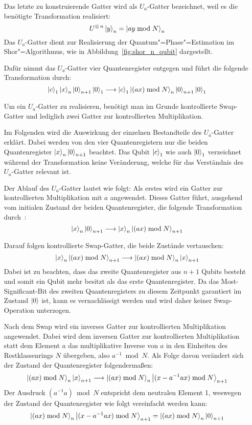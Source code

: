Das letzte zu konstruierende Gatter wird als \(U_a\)-Gatter bezeichnet, 
weil es die benötigte Transformation realisiert: 
\[U^{\operatorname{\otimes} n}\ket{y}_n = \ket{ay \bmod N}_n\] 
Das \(U_a\)-Gatter dient zur Realisierung der Quantum"=Phase"=Estimation im Shor"=Algorithmus, 
wie in Abbildung~\ref{fig:shor_n_qubit} dargestellt.

Dafür nimmt das \(U_a\)-Gatter vier Quantenregister entgegen und 
führt die folgende Transformation durch: 
\[\ket{c}_1\ket{x}_{n}\ket{0}_{n+1}\ket{0}_1
\longrightarrow
\ket{c}_1\ket{(a x) \bmod N}_{n}\ket{0}_{n+1}\ket{0}_1
\]

Um ein \(U_a\)-Gatter zu realisieren, benötigt man im Grunde kontrollierte Swap-Gatter und 
lediglich zwei Gatter zur kontrollierten Multiplikation. 
 
Im Folgenden wird die Auswirkung der einzelnen Bestandteile des \(U_a\)-Gatter erklärt.
Dabei werden von den vier Quantenregistern nur die beiden 
Quantenregister \(\ket{x}_{n}\ket{0}_{n+1}\) beachtet.
Das Qubit \(\ket{c}_1\) wie auch \(\ket{0}_1\) verzeichnet während der Transformation keine Veränderung, 
welche für das Verständnis des \(U_a\)-Gatter relevant ist.

Der Ablauf des \(U_a\)-Gatter lautet wie folgt:
Als erstes wird ein Gatter zur kontrollierten Multiplikation mit \(a\) angewendet. 
Dieses Gatter führt, 
ausgehend vom initialen Zustand der beiden Quantenregister, 
die folgende Transformation durch~\cite{beauregard2003circuit}:
\[
  \ket{x}_{n}\ket{0}_{n+1}
  \longrightarrow
  \ket{x}_{n}\ket{(ax)\bmod N}_{n+1}
  \]

Darauf folgen kontrollierte Swap-Gatter, die beide Zustände vertauschen:
\[
  \ket{x}_{n}\ket{(ax)\bmod N}_{n+1}
\longrightarrow
\ket{(ax)\bmod N}_{n}\ket{x}_{n+1}
\]
Dabei ist zu beachten, 
dass das zweite Quantenregister aus \(n+1\) Qubits besteht und
somit ein Qubit mehr besitzt als das erste Quantenregister.
Da das Most-Significant-Bit des zweiten Quantenregisters zu diesem Zeitpunkt garantiert im Zustand \(\ket{0}\) ist, 
kann es vernachlässigt werden und wird daher keiner Swap-Operation unterzogen.

Nach dem Swap wird ein inverses Gatter zur kontrollierten Multiplikation angewendet.
Dabei wird dem inversen Gatter zur kontrollierten Multiplikation statt dem Element \(a\) 
das multiplikative Inverse von \(a\) in den Einheiten des Restklassenrings \(N\) übergeben, 
also \(a^{-1} \bmod N\).
Als Folge davon verändert sich der Zustand der Quantenregister folgendermaßen:  
\[\ket{(ax)\bmod N}_{n}\ket{x}_{n+1}
\longrightarrow
\ket{(ax)\bmod N}_{n}\ket{(x-a^{-1}ax)\bmod N}_{n+1}
\] 
Der Ausdruck \((a^{-1}a)\bmod N\) entspricht dem neutralen Element 1, 
weswegen der Zustand der Quantenregister wie folgt vereinfacht werden kann:  
\[
\ket{(ax)\bmod N}_{n}\ket{(x-a^{-1}ax)\bmod N}_{n+1}
=
\ket{(ax)\bmod N}_{n}\ket{0}_{n+1}
\] 

